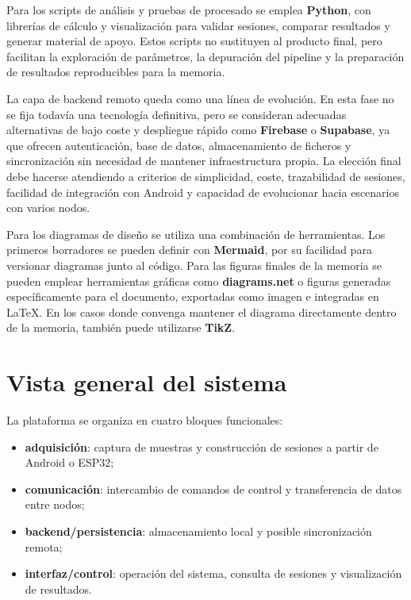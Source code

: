 Para los scripts de análisis y pruebas de procesado se emplea \textbf{Python}, con librerías de cálculo y visualización para validar sesiones, comparar resultados y generar material de apoyo. Estos scripts no sustituyen al producto final, pero facilitan la exploración de parámetros, la depuración del pipeline y la preparación de resultados reproducibles para la memoria.

La capa de backend remoto queda como una línea de evolución. En esta fase no se fija todavía una tecnología definitiva, pero se consideran adecuadas alternativas de bajo coste y despliegue rápido como \textbf{Firebase} o \textbf{Supabase}, ya que ofrecen autenticación, base de datos, almacenamiento de ficheros y sincronización sin necesidad de mantener infraestructura propia. La elección final debe hacerse atendiendo a criterios de simplicidad, coste, trazabilidad de sesiones, facilidad de integración con Android y capacidad de evolucionar hacia escenarios con varios nodos.

Para los diagramas de diseño se utiliza una combinación de herramientas. Los primeros borradores se pueden definir con \textbf{Mermaid}, por su facilidad para versionar diagramas junto al código. Para las figuras finales de la memoria se pueden emplear herramientas gráficas como \textbf{diagrams.net} o figuras generadas específicamente para el documento, exportadas como imagen e integradas en LaTeX. En los casos donde convenga mantener el diagrama directamente dentro de la memoria, también puede utilizarse \textbf{TikZ}.

\section{Vista general del sistema}

La plataforma se organiza en cuatro bloques funcionales:

\begin{itemize}
  \item \textbf{adquisición}: captura de muestras y construcción de sesiones a partir de Android o ESP32;
  \item \textbf{comunicación}: intercambio de comandos de control y transferencia de datos entre nodos;
  \item \textbf{backend/persistencia}: almacenamiento local y posible sincronización remota;
  \item \textbf{interfaz/control}: operación del sistema, consulta de sesiones y visualización de resultados.
\end{itemize}

